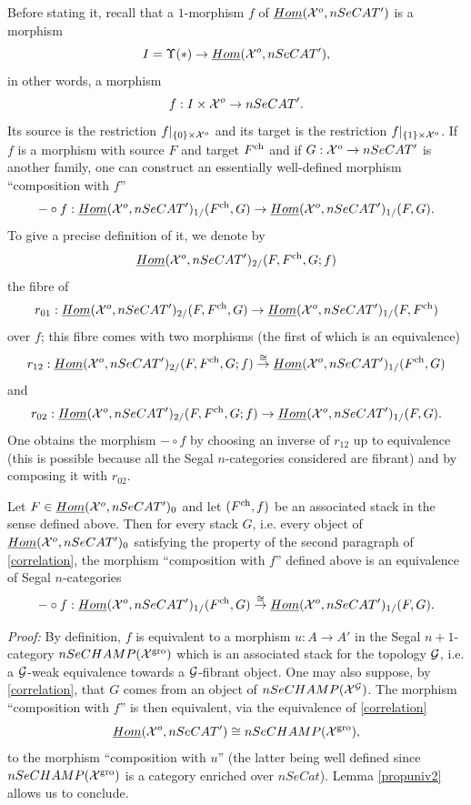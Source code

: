 Before stating it, recall that a $1$-morphism $f$ of
$\underline{Hom}({\cal X} ^o, nSeCAT')$ is a morphism
$$
I=\Upsilon (\ast )\rightarrow \underline{Hom}({\cal X} ^o, nSeCAT'),
$$
in other words, a morphism
$$
f:I\times {\cal X} ^o\rightarrow nSeCAT'.
$$
Its source is the restriction $f|_{\{ 0\} \times {\cal X} ^o}$ and its target
is the restriction $f|_{\{ 1\} \times {\cal X} ^o}$. If $f$ is a morphism with
source $F$ and target $F^{\rm ch}$ and if $G:{\cal X} ^o\rightarrow nSeCAT'$ is
another family, one can construct
an essentially well-defined morphism ``composition with $f$''
$$
-\circ f : \underline{Hom}({\cal X} ^o, nSeCAT')_{1/}(F^{\rm ch}, G)
\rightarrow \underline{Hom}({\cal X} ^o, nSeCAT')_{1/}(F, G).
$$
To give a precise definition of it, we denote by
$$
\underline{Hom}({\cal X} ^o, nSeCAT')_{2/}(F,F^{\rm ch}, G;f)
$$
the fibre of
$$
r_{01}:\underline{Hom}({\cal X} ^o, nSeCAT')_{2/}(F,F^{\rm ch}, G)
\rightarrow \underline{Hom}({\cal X} ^o, nSeCAT')_{1/}(F,F^{\rm ch})
$$
over $f$; this fibre comes with two morphisms
(the first of which is an equivalence)
$$
r_{12}:\underline{Hom}({\cal X} ^o, nSeCAT')_{2/}(F,F^{\rm ch}, G;f)
\stackrel{\cong}{\rightarrow}
\underline{Hom}({\cal X} ^o, nSeCAT')_{1/}(F^{\rm ch}, G)
$$
and
$$
r_{02}:\underline{Hom}({\cal X} ^o, nSeCAT')_{2/}(F,F^{\rm ch}, G;f)
\rightarrow
\underline{Hom}({\cal X} ^o, nSeCAT')_{1/}(F, G).
$$
One obtains the morphism $-\circ f$ by choosing an inverse of $r_{12}$
up to equivalence (this is possible because all the Segal $n$-categories
considered are fibrant) and by composing it with $r_{02}$.

\begin{lemma}
\label{propuniv3}
Let $F\in \underline{Hom}({\cal X} ^o, nSeCAT')_0$ and let $(F^{\rm ch}, f)$
be an associated stack in the sense defined above. Then for every stack
$G$, i.e. every object of $\underline{Hom}({\cal X} ^o, nSeCAT')_0$ satisfying the
property of the second paragraph of \ref{correlation}, the morphism
``composition with $f$'' defined above is an equivalence of
Segal $n$-categories
$$
-\circ f : \underline{Hom}({\cal X} ^o, nSeCAT')_{1/}(F^{\rm ch}, G)
\stackrel{\cong}{\rightarrow} \underline{Hom}({\cal X} ^o, nSeCAT')_{1/}(F, G).
$$
\end{lemma}
{\em Proof:}
By definition, $f$ is equivalent to a morphism $u: A\rightarrow A'$
in the Segal $n+1$-category $nSeCHAMP({\cal X} ^{\rm gro})$ which is an
associated stack for the topology ${\cal G}$, i.e. a ${\cal G}$-weak equivalence towards
a ${\cal G}$-fibrant object. One may also suppose, by \ref{correlation}, that $G$
comes from an object of $nSeCHAMP({\cal X} ^{{\cal G}})$. The morphism ``composition with
$f$'' is then equivalent, via the equivalence of \ref{correlation}
$$
\underline{Hom}({\cal X} ^o, nSeCAT')\cong
nSeCHAMP({\cal X} ^{\rm gro}),
$$
to the morphism ``composition with $u$'' (the latter being well defined since
$nSeCHAMP({\cal X} ^{\rm gro})$ is a category enriched over $nSeCat$). Lemma
\ref{propuniv2} allows us to conclude.
\eop

